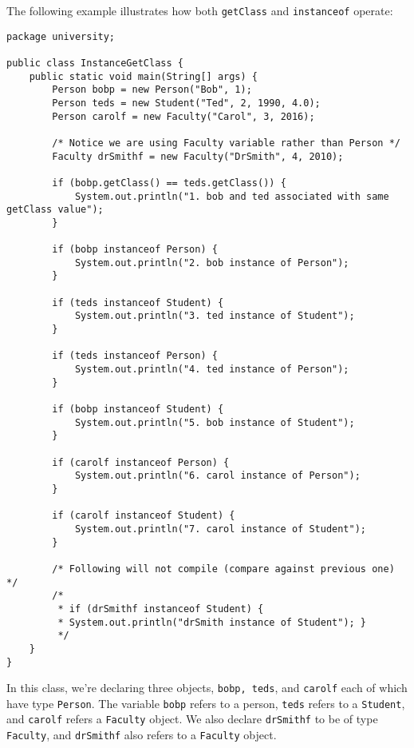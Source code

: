 The following example illustrates how both \verb!getClass! and \verb!instanceof! operate:


\begin{lstlisting}
package university;

public class InstanceGetClass {
	public static void main(String[] args) {
		Person bobp = new Person("Bob", 1);
		Person teds = new Student("Ted", 2, 1990, 4.0);
		Person carolf = new Faculty("Carol", 3, 2016);

		/* Notice we are using Faculty variable rather than Person */
		Faculty drSmithf = new Faculty("DrSmith", 4, 2010);

		if (bobp.getClass() == teds.getClass()) {
			System.out.println("1. bob and ted associated with same getClass value");
		}

		if (bobp instanceof Person) {
			System.out.println("2. bob instance of Person");
		}

		if (teds instanceof Student) {
			System.out.println("3. ted instance of Student");
		}

		if (teds instanceof Person) {
			System.out.println("4. ted instance of Person");
		}

		if (bobp instanceof Student) {
			System.out.println("5. bob instance of Student");
		}

		if (carolf instanceof Person) {
			System.out.println("6. carol instance of Person");
		}

		if (carolf instanceof Student) {
			System.out.println("7. carol instance of Student");
		}

		/* Following will not compile (compare against previous one) */
		/*
		 * if (drSmithf instanceof Student) {
		 * System.out.println("drSmith instance of Student"); }
		 */
	}
}
\end{lstlisting}

In this class, we're declaring three objects, \verb!bobp, teds!, and \verb!carolf! each of which have type \verb!Person!. The variable \verb!bobp! refers to a person, \verb!teds! refers to a \verb!Student!, and \verb!carolf! refers a \verb!Faculty! object. We also declare \verb!drSmithf! to be of type \verb!Faculty!, and \verb!drSmithf! also refers to a \verb!Faculty! object.


